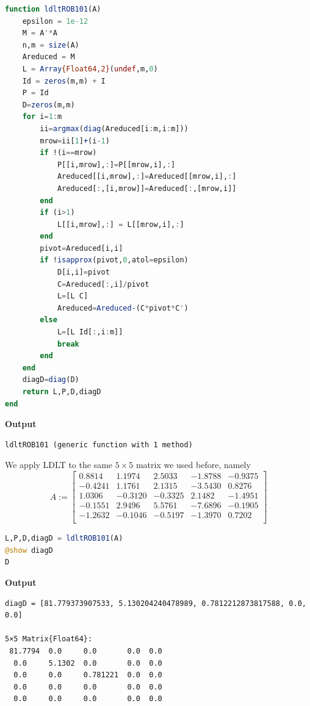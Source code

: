 \begin{lstlisting}[language=Julia,style=mystyle]
function ldltROB101(A)
    epsilon = 1e-12
    M = A'*A
    n,m = size(A)
    Areduced = M
    L = Array{Float64,2}(undef,m,0)
    Id = zeros(m,m) + I
    P = Id    
    D=zeros(m,m)
    for i=1:m
        ii=argmax(diag(Areduced[i:m,i:m]))
        mrow=ii[1]+(i-1)
        if !(i==mrow)
            P[[i,mrow],:]=P[[mrow,i],:]
            Areduced[[i,mrow],:]=Areduced[[mrow,i],:]
            Areduced[:,[i,mrow]]=Areduced[:,[mrow,i]]
        end
        if (i>1)
            L[[i,mrow],:] = L[[mrow,i],:]
        end
        pivot=Areduced[i,i]
        if !isapprox(pivot,0,atol=epsilon)
            D[i,i]=pivot
            C=Areduced[:,i]/pivot
            L=[L C]
            Areduced=Areduced-(C*pivot*C')
        else
            L=[L Id[:,i:m]]
            break
        end
    end
    diagD=diag(D)
    return L,P,D,diagD
end
\end{lstlisting}
\textbf{Output} 
\begin{verbatim}
ldltROB101 (generic function with 1 method)
\end{verbatim}

We apply LDLT to the same $5 \times 5$ matrix we used before, namely
\begin{equation}
A:= \left[
\begin{array}{rrrrr}
0.8814 & 1.1974 & 2.5033 & -1.8788 & -0.9375 \\
-0.4241 & 1.1761 & 2.1315 & -3.5430 & 0.8276 \\
1.0306 & -0.3120 & -0.3325 & 2.1482 & -1.4951 \\
-0.1551 & 2.9496 & 5.5761 & -7.6896 & -0.1905 \\
-1.2632 & -0.1046 & -0.5197 & -1.3970 & 0.7202 \\
\end{array}
\right]
\end{equation} 

\begin{lstlisting}[language=Julia,style=mystyle]
L,P,D,diagD = ldltROB101(A)
@show diagD
D
\end{lstlisting}
\textbf{Output} 
\begin{verbatim}
diagD = [81.779373907533, 5.130204240478989, 0.7812212873817588, 0.0, 0.0]

5×5 Matrix{Float64}:
 81.7794  0.0     0.0       0.0  0.0
  0.0     5.1302  0.0       0.0  0.0
  0.0     0.0     0.781221  0.0  0.0
  0.0     0.0     0.0       0.0  0.0
  0.0     0.0     0.0       0.0  0.0
\end{verbatim}

